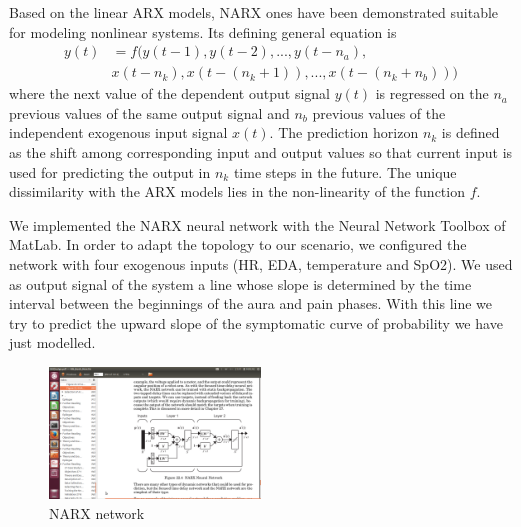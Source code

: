 \label{sec:ANN:NARX}

Based on the linear ARX models, NARX ones have been demonstrated 
suitable for modeling nonlinear systems. Its defining general 
equation is
\begin{equation*}
\begin{split}
y(t) &=f(y(t-1),y(t-2),...,y(t-n_{a}), \\
&x(t-n_{k}),x(t-(n_{k}+1)),...,x(t-(n_{k}+n_{b})))
\end{split}
\end{equation*}
where the next value of the dependent output signal $y(t)$ is 
regressed on the $n_{a}$ previous values of the same output signal 
and $n_{b}$ previous values of the independent exogenous input 
signal $x(t)$. The prediction horizon $n_{k}$ is defined as the 
shift among corresponding input and output values so that current 
input is used for predicting the output in $n_{k}$ time steps in the 
future. The unique dissimilarity with the ARX models lies in the 
non-linearity of the function $f$. 

We implemented the NARX neural network with the Neural Network 
Toolbox of MatLab. In order to adapt the topology to our scenario, 
we configured the network with four exogenous inputs (HR, EDA, 
temperature and SpO2). We used as output signal of the system a line 
whose slope is determined by the time interval between the 
beginnings of the aura and pain phases. With this line we try to 
predict the upward slope of the symptomatic curve of probability we 
have just modelled. 

\begin{figure}[!ht]
\centering
\includegraphics[width=0.5\textwidth]{images/narx.png}
\caption{NARX network}
\label{fig:narx}
\end{figure}


